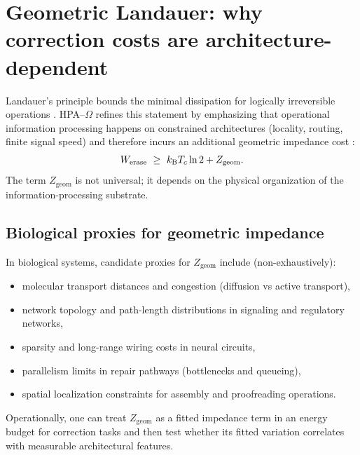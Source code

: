 \section{Geometric Landauer: why correction costs are architecture-dependent}
\label{app:geometric_landauer}

Landauer's principle bounds the minimal dissipation for logically irreversible operations \cite{Landauer1961,Bennett1973}.
HPA--$\Omega$ refines this statement by emphasizing that operational information processing happens on constrained architectures (locality, routing, finite signal speed) and therefore incurs an additional geometric impedance cost \cite{Ma2025HPT,Ma2025CT}:
\begin{equation}
  W_{\mathrm{erase}}\ \ge\ k_{\mathrm{B}} T_c\ln 2 + Z_{\mathrm{geom}}.
\end{equation}
The term $Z_{\mathrm{geom}}$ is not universal; it depends on the physical organization of the information-processing substrate.

\subsection{Biological proxies for geometric impedance}
\label{app:Zgeom_proxies}

In biological systems, candidate proxies for $Z_{\mathrm{geom}}$ include (non-exhaustively):
\begin{itemize}
  \item molecular transport distances and congestion (diffusion vs active transport),
  \item network topology and path-length distributions in signaling and regulatory networks,
  \item sparsity and long-range wiring costs in neural circuits,
  \item parallelism limits in repair pathways (bottlenecks and queueing),
  \item spatial localization constraints for assembly and proofreading operations.
\end{itemize}
Operationally, one can treat $Z_{\mathrm{geom}}$ as a fitted impedance term in an energy budget for correction tasks and then test whether its fitted variation correlates with measurable architectural features.


